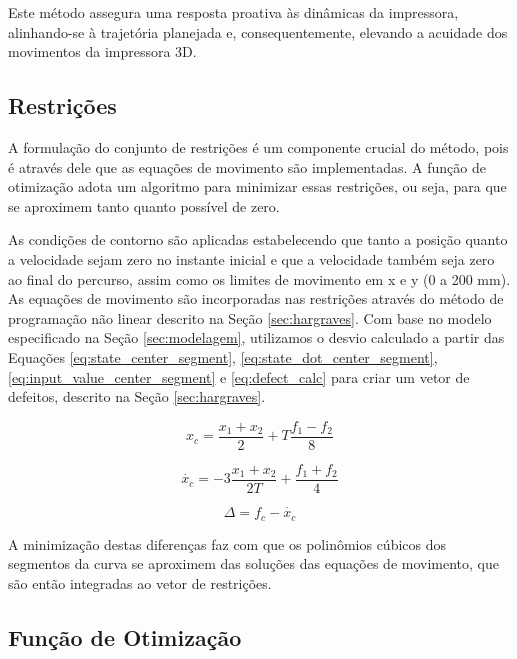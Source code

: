 Este método assegura uma resposta proativa às dinâmicas da impressora, alinhando-se à trajetória planejada e, consequentemente, elevando a acuidade dos movimentos da impressora 3D.

\subsection{Restrições}

A formulação do conjunto de restrições é um componente crucial do método, pois é através dele que as equações de movimento são implementadas. A função de otimização adota um algoritmo para minimizar essas restrições, ou seja, para que se aproximem tanto quanto possível de zero.

As condições de contorno são aplicadas estabelecendo que tanto a posição quanto a velocidade sejam zero no instante inicial e que a velocidade também seja zero ao final do percurso, assim como os limites de movimento em x e y (0 a 200 mm). As equações de movimento são incorporadas nas restrições através do método de programação não linear descrito na Seção \ref{sec:hargraves}. Com base no modelo especificado na Seção \ref{sec:modelagem}, utilizamos o desvio calculado a partir das Equações \ref{eq:state_center_segment}, \ref{eq:state_dot_center_segment}, \ref{eq:input_value_center_segment} e \ref{eq:defect_calc} para criar um vetor de defeitos, descrito na Seção \ref{sec:hargraves}. 

\begin{equation}
    \label{eq:state_center_segment}
    x_c = \frac{x_{1} + x_{2}}{2} + T\frac{f_{1} - f_{2}}{8}
\end{equation}

\begin{equation}
    \label{eq:state_dot_center_segment}
    \dot{x_{c}} = -3\frac{x_{1} + x_{2}}{2T} + \frac{f_{1} + f_{2}}{4}
\end{equation}

\begin{equation}
    \label{eq:defect_calc}
    \Delta = f_c - \dot{x_c}
\end{equation}

A minimização destas diferenças faz com que os polinômios cúbicos dos segmentos da curva se aproximem das soluções das equações de movimento, que são então integradas ao vetor de restrições.

\subsection{Função de Otimização}

